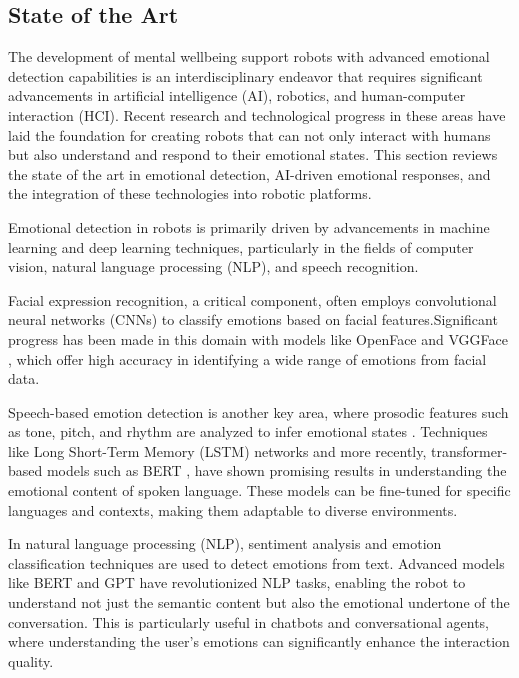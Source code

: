 \subsection{State of the Art}
    
The development of mental wellbeing support robots with advanced emotional detection capabilities is an interdisciplinary endeavor that requires significant advancements in artificial intelligence (AI), robotics, and human-computer interaction (HCI). Recent research and technological progress in these areas have laid the foundation for creating robots that can not only interact with humans but also understand and respond to their emotional states. This section reviews the state of the art in emotional detection, AI-driven emotional responses, and the integration of these technologies into robotic platforms.

Emotional detection in robots is primarily driven by advancements in machine learning and deep learning techniques, particularly in the fields of computer vision, natural language processing (NLP), and speech recognition.

Facial expression recognition, a critical component, often employs convolutional neural networks (CNNs) to classify emotions based on facial features.Significant progress has been made in this domain with models like OpenFace \cite{baltrusaitis2018} and VGGFace \cite{zhang2023}, which offer high accuracy in identifying a wide range of emotions from facial data.

Speech-based emotion detection is another key area, where prosodic features such as tone, pitch, and rhythm are analyzed to infer emotional states \cite{swethashree2021}. Techniques like Long Short-Term Memory (LSTM) networks and more recently, transformer-based models such as BERT \cite{devlin2019}, have shown promising results in understanding the emotional content of spoken language. These models can be fine-tuned for specific languages and contexts, making them adaptable to diverse environments.

In natural language processing (NLP), sentiment analysis and emotion classification techniques are used to detect emotions from text. Advanced models like BERT \cite{wu2024} and GPT \cite{shahriar2024} have revolutionized NLP tasks, enabling the robot to understand not just the semantic content but also the emotional undertone of the conversation. This is particularly useful in chatbots and conversational agents, where understanding the user's emotions can significantly enhance the interaction quality.


